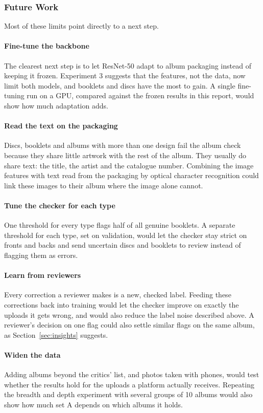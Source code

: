 \documentclass[conference]{IEEEtran}
\begin{document}
\subsubsection{Future Work}\label{sec:future}
Most of these limits point directly to a next step.

\paragraph{Fine-tune the backbone} The clearest next step is to let ResNet-50 adapt to album packaging instead of keeping it frozen. Experiment 3 suggests that the features, not the data, now limit both models, and booklets and discs have the most to gain. A single fine-tuning run on a GPU, compared against the frozen results in this report, would show how much adaptation adds.

\paragraph{Read the text on the packaging} Discs, booklets and albums with more than one design fail the album check because they share little artwork with the rest of the album. They usually do share text: the title, the artist and the catalogue number. Combining the image features with text read from the packaging by optical character recognition could link these images to their album where the image alone cannot.

\paragraph{Tune the checker for each type} One threshold for every type flags half of all genuine booklets. A separate threshold for each type, set on validation, would let the checker stay strict on fronts and backs and send uncertain discs and booklets to review instead of flagging them as errors.

\paragraph{Learn from reviewers} Every correction a reviewer makes is a new, checked label. Feeding these corrections back into training would let the checker improve on exactly the uploads it gets wrong, and would also reduce the label noise described above. A reviewer's decision on one flag could also settle similar flags on the same album, as Section~\ref{sec:insights} suggests.

\paragraph{Widen the data} Adding albums beyond the critics' list, and photos taken with phones, would test whether the results hold for the uploads a platform actually receives. Repeating the breadth and depth experiment with several groups of 10 albums would also show how much set A depends on which albums it holds.
\end{document}
